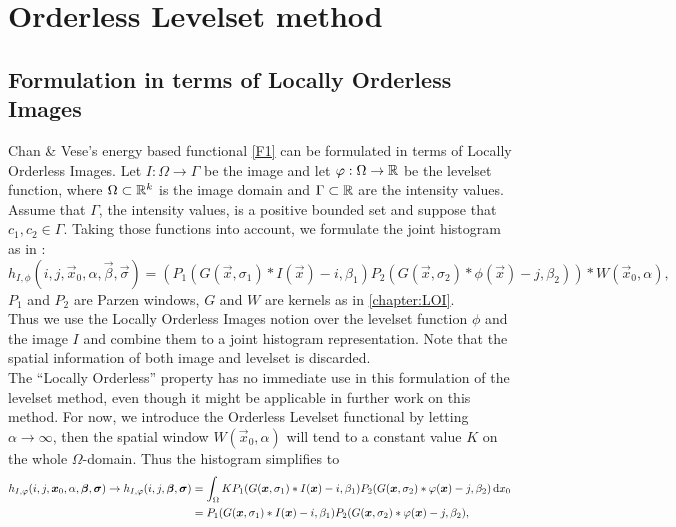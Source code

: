 
\chapter{Orderless Levelset method}\label{chapter:OL}

\section{Formulation in terms of Locally Orderless Images}\label{section:OLform}
Chan \& Vese's energy based functional \eqref{F1} can be formulated in terms of Locally Orderless Images. Let $I:\Omega\to \Gamma$ be the image and let $\varphi:\Omega\to\mathbb R$ be the levelset function, where $\Omega\subset \mathbb R^k$ is the image domain and $\Gamma\subset\mathbb R$ are the intensity values. Assume that $\Gamma$, the intensity values, is a positive bounded set and suppose that $c_1,c_2\in \Gamma$. Taking those functions into account, we formulate the joint histogram as in \cite{dar.11}:
\begin{equation}
  h_{I,\phi}(i,j,\vec{x}_0,\alpha,\vec{\beta},\vec{\sigma}) = (P_1(G(\vec{x},\sigma_1)*I(\vec{x})-i,\beta_1)P_2(G(\vec{x},\sigma_2)*\phi(\vec{x})-j,\beta_2))*W(\vec{x}_0,\alpha),
\end{equation}
$P_1$ and $P_2$ are Parzen windows, $G$ and $W$ are kernels as in \cref{chapter:LOI}.\\
Thus we use the Locally Orderless Images notion over the levelset function $\phi$ and the image $I$ and combine them to a joint histogram representation. Note that the spatial information of both image and levelset is discarded.\\
The ``Locally Orderless'' property has no immediate use in this formulation of the levelset method, even though it might be applicable in further work on this method. For now, we introduce the Orderless Levelset functional by letting $\alpha\to \infty$, then the spatial window $W(\vec{x}_0,\alpha)$ will tend to a constant value $K$ on the whole $\Omega$-domain. Thus the histogram simplifies to
\begin{equation}
  \begin{split}
    h_{I,\varphi}(i,j,\boldsymbol{x} _0,\alpha,\boldsymbol{\beta} ,\boldsymbol{\sigma} )\to h_{I,\varphi}(i,j,\boldsymbol{\beta} ,\boldsymbol{\sigma} ) &= \int _\Omega KP_1(G(\boldsymbol{x} ,\sigma_1)*I(\boldsymbol{x} )-i,\beta_1)P_2(G(\boldsymbol{x} ,\sigma_2)*\varphi(\boldsymbol{x} )-j,\beta_2)\,{\rm d} x_0\\
    &= P_1(G(\boldsymbol{x} ,\sigma_1)*I(\boldsymbol{x} )-i,\beta_1)P_2(G(\boldsymbol{x} ,\sigma_2)*\varphi(\boldsymbol{x} )-j,\beta_2),
  \end{split}
\end{equation}

